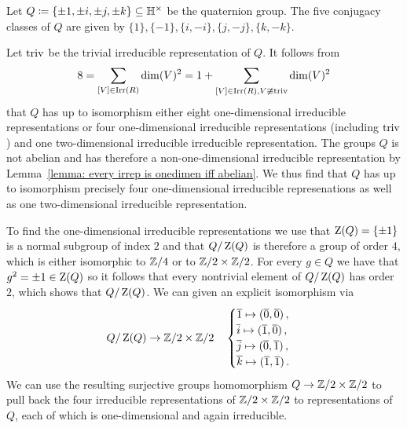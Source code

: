 \begin{example}
  Let $Q \coloneqq \{ \pm 1, \pm i, \pm j, \pm k \} \subseteq \mathbb{H}^\times$ be the quaternion group.
  The five conjugacy classes of $Q$ are given by $\{1\}, \{-1\}, \{i, -i\}, \{j, -j\}, \{k, -k\}$.
  
  Let $\operatorname{triv}$ be the trivial irreducible representation of $Q$.
  It follows from
  \[
      8
    = \sum_{[V] \in \operatorname{Irr}(R)} \dim(V)^2
    = 1 + \sum_{[V] \in \operatorname{Irr}(R), V \ncong \operatorname{triv}}  \dim(V)^2
  \]
  that $Q$ has up to isomorphism either eight one-dimensional irreducible representations or four one-dimensional irreducible representations (including $\operatorname{triv}$) and one two-dimensional irreducible irreducible representation.
  The groups $Q$ is not abelian and has therefore a non-one-dimensional irreducible representation by Lemma~\ref{lemma: every irrep is onedimen iff abelian}.
  We thus find that $Q$ has up to isomorphism precisely four one-dimensional irreducible represenations as well as one two-dimensional irreducible representation.
  
  To find the one-dimensional irreducible representations we use that $\operatorname{Z}(Q) = \{\pm 1\}$ is a normal subgroup of index $2$ and that $Q/\operatorname{Z}(Q)$ is therefore a group of order $4$, which is either isomorphic to $\mathbb{Z}/4$ or to $\mathbb{Z}/2 \times \mathbb{Z}/2$.
  For every $g \in Q$ we have that $g^2 = \pm 1 \in \operatorname{Z}(Q)$ so it follows that every nontrivial element of $Q/\operatorname{Z}(Q)$ has order $2$, which shows that $Q/\operatorname{Z}(Q)$.
  We can given an explicit isomorphism via
  \[
            Q/\operatorname{Z}(Q)
    \to     \mathbb{Z}/2 \times \mathbb{Z}/2
    \quad   \begin{cases}
              \overline{1} \mapsto (\overline{0}, \overline{0}) \,,  \\
              \overline{i} \mapsto (\overline{1}, \overline{0}) \,,  \\
              \overline{j} \mapsto (\overline{0}, \overline{1}) \,,  \\
              \overline{k} \mapsto (\overline{1}, \overline{1}) \,.
            \end{cases}
  \]
  We can use the resulting surjective groups homomorphism $Q \to \mathbb{Z}/2 \times \mathbb{Z}/2$ to pull back the four irreducible representations of $\mathbb{Z}/2 \times \mathbb{Z}/2$ to representations of $Q$, each of which is one-dimensional and again irreducible.
  

\end{example}

